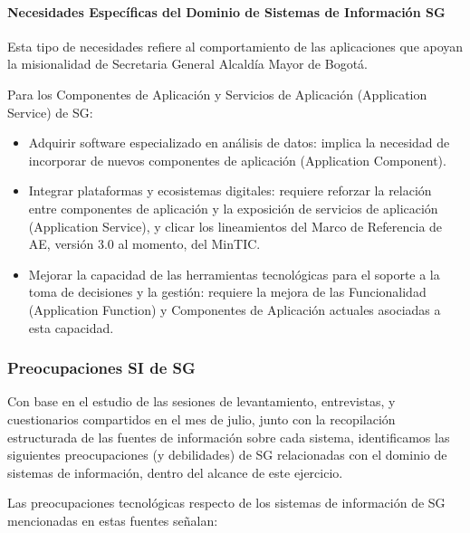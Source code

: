 \documentclass[
	a4paper, %
	12pt, %
]{include/CSSullivanBusinessReport}
\def\tightlist{}
\begin{document}
\paragraph{Necesidades Específicas del Dominio de Sistemas de
Información
SG}\label{sec:necesidades-especuxedficas-del-dominio-de-sistemas-de-informaciuxf3n-sg}

Esta tipo de necesidades refiere al comportamiento de las aplicaciones
que apoyan la misionalidad de Secretaria General Alcaldía Mayor de
Bogotá.

Para los Componentes de Aplicación y Servicios de Aplicación
(Application Service) de SG:

\begin{itemize}
\tightlist
\item
  Adquirir software especializado en análisis de datos: implica la
  necesidad de incorporar de nuevos componentes de aplicación
  (Application Component).
\item
  Integrar plataformas y ecosistemas digitales: requiere reforzar la
  relación entre componentes de aplicación y la exposición de servicios
  de aplicación (Application Service), y clicar los lineamientos del
  Marco de Referencia de AE, versión 3.0 al momento, del MinTIC.
\item
  Mejorar la capacidad de las herramientas tecnológicas para el soporte
  a la toma de decisiones y la gestión: requiere la mejora de las
  Funcionalidad (Application Function) y Componentes de Aplicación
  actuales asociadas a esta capacidad.
\end{itemize}

\subsubsection{Preocupaciones SI de
SG}\label{sec:preocupaciones-si-de-sg}

Con base en el estudio de las sesiones de levantamiento, entrevistas, y
cuestionarios compartidos en el mes de julio, junto con la recopilación
estructurada de las fuentes de información sobre cada sistema,
identificamos las siguientes preocupaciones (y debilidades) de SG
relacionadas con el dominio de sistemas de información, dentro del
alcance de este ejercicio.

Las preocupaciones tecnológicas respecto de los sistemas de información
de SG mencionadas en estas fuentes señalan:
\end{document}
